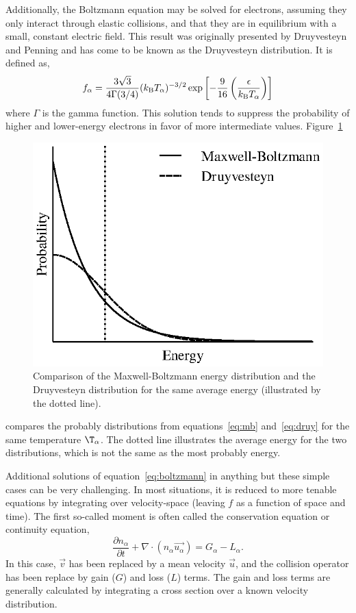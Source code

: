 Additionally, the Boltzmann equation may be solved for electrons, assuming they
only interact through elastic collisions, and that they are in equilibrium with
a small, constant electric field. This result was originally presented by
Druyvesteyn and Penning \cite{Druyvesteyn1940} and has come to be known as the
Druyvesteyn distribution. It is defined as,
\begin{equation}
  f_{\alpha} = \frac{3\sqrt{3}}{4\Gamma(3/4)}(k_\mathrm{B} T_\alpha)^{-3/2}
  \exp{\left[-\frac{9}{16}\left(\frac{\epsilon}{k_\mathrm{B}T_\alpha}\right)\right]}
  \label{eq:druy}
\end{equation}
where $\Gamma$ is the gamma function. This solution tends to suppress the
probability of higher and lower-energy electrons in favor of more intermediate
values. Figure~\ref{fig:simpledists}
\begin{figure}
  \centering
  \includegraphics{./chapters/theory/figures/simpledists.eps}
  \caption{Comparison of the Maxwell-Boltzmann energy distribution and the
    Druyvesteyn distribution for the same average energy (illustrated by the
  dotted line).}
  \label{fig:simpledists}
\end{figure}
compares the probably distributions from equations~\ref{eq:mb} and~\ref{eq:druy}
for the same temperature $\T_\alpha$. The dotted line illustrates the average
energy for the two distributions, which is not the same as the most probably
energy.

Additional solutions of equation~\ref{eq:boltzmann} in anything but these simple
cases can be very challenging. In most situations, it is reduced to more tenable
equations by integrating over velocity-space (leaving $f$ as a function of space
and time). The first so-called moment is often called the conservation equation
or continuity equation,
\begin{equation}\label{eq:cont}
  \frac{\partial n_\alpha}{\partial t} + \nabla \cdot (n_\alpha \vec{u_\alpha})
  = G_\alpha - L_\alpha.
\end{equation}
In this case, $\vec{v}$ has been replaced by a mean velocity $\vec{u}$, and the
collision operator has been replace by gain ($G$) and loss ($L$) terms. The gain
and loss terms are generally calculated by integrating a cross section over a
known velocity distribution.

